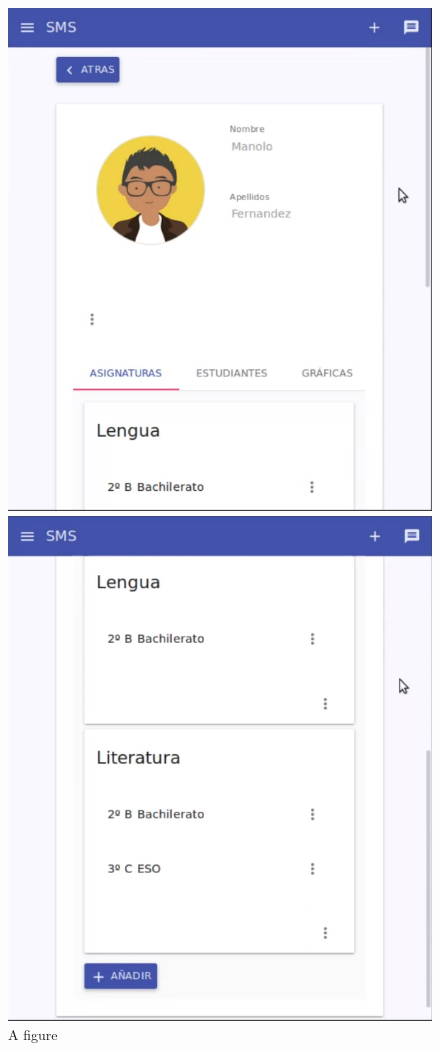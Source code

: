 \begin{figure}[H]
\centering
\begin{minipage}{.5\textwidth}
  \centering
  \includegraphics[scale=0.3]{img/snaps/teacher_profile.png}
  \caption{A figure}
\end{minipage}%
\begin{minipage}{.5\textwidth}
  \centering
  \includegraphics[scale=0.3]{img/snaps/teacher_profile_2.png}

\end{minipage}
\end{figure}
